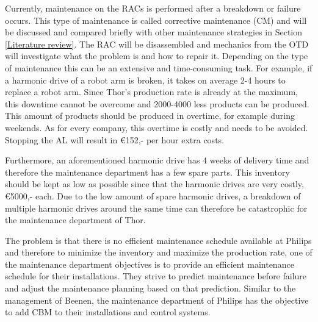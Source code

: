 
Currently, maintenance on the RACs is performed after a breakdown or failure occurs. This type of maintenance is called corrective maintenance (CM) and will be discussed and compared briefly with other maintenance strategies in Section \ref{Literature review}. The RAC will be disassembled and mechanics from the OTD will investigate what the problem is and how to repair it. Depending on the type of maintenance this can be an extensive and time-consuming task. For example, if a harmonic drive of a robot arm is broken, it takes on average 2-4 hours to replace a robot arm. Since Thor's production rate is already at the maximum, this downtime cannot be overcome and 2000-4000 less products can be produced. This amount of products should be produced in overtime, for example during weekends. As for every company, this overtime is costly and needs to be avoided. Stopping the AL will result in €152,- per hour extra costs.  

Furthermore, an aforementioned harmonic drive has 4 weeks of delivery time and therefore the maintenance department has a few spare parts. This inventory should be kept as low as possible since that the harmonic drives are very costly, €5000,- each. Due to the low amount of spare harmonic drives, a breakdown of multiple harmonic drives around the same time can therefore be catastrophic for the maintenance department of Thor. 

The problem is that there is no efficient maintenance schedule available at Philips and therefore to minimize the inventory and maximize the production rate, one of the maintenance department objectives is to provide an efficient maintenance schedule for their installations. They strive to predict maintenance before failure and adjust the maintenance planning based on that prediction. Similar to the management of Beenen, the maintenance department of Philips has the objective to add CBM to their installations and control systems. 

